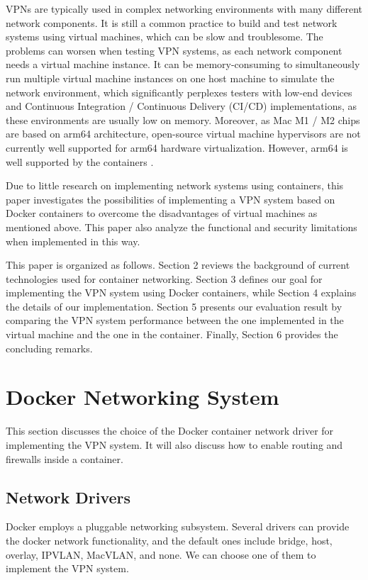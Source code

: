 \documentclass[article]{aaltoseries}
\begin{document}
VPNs are typically used in complex networking environments with many different network components. It is still a common practice \cite{9151942} to build and test network systems using virtual machines, which can be slow and troublesome. The problems can worsen when testing VPN systems, as each network component needs a virtual machine instance. It can be memory-consuming to simultaneously run multiple virtual machine instances on one host machine to simulate the network environment, which significantly perplexes testers with low-end devices and Continuous Integration / Continuous Delivery (CI/CD) implementations, as these environments are usually low on memory. Moreover, as Mac M1 / M2 chips are based on arm64 architecture, open-source virtual machine hypervisors are not currently well supported for arm64 hardware virtualization. However, arm64 is well supported by the containers \cite{9852232}.

Due to little research on implementing network systems using containers, this paper investigates the possibilities of implementing a VPN system based on Docker containers to overcome the disadvantages of virtual machines as mentioned above. This paper also analyze the functional and security limitations when implemented in this way.

This paper is organized as follows. Section 2 reviews the background of current technologies used for container networking. Section 3 defines our goal for implementing the VPN system using Docker containers, while Section 4 explains the details of our implementation. Section 5 presents our evaluation result by comparing the VPN system performance between the one implemented in the virtual machine and the one in the container. Finally, Section 6 provides the concluding remarks.



\section{Docker Networking System}
This section discusses the choice of the Docker container network driver for implementing the VPN system. It will also discuss how to enable routing and firewalls inside a container.

\subsection{Network Drivers}
Docker employs a pluggable networking subsystem. Several drivers can provide the docker network functionality, and the default ones include bridge, host, overlay, IPVLAN, MacVLAN, and none. We can choose one of them to implement the VPN system.
\end{document}
